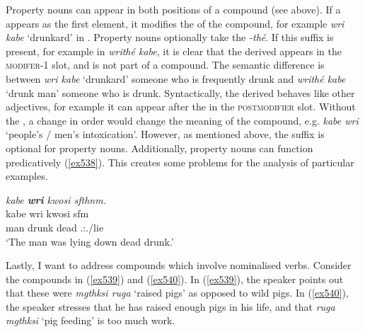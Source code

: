 Property nouns can appear in both positions of a compound (see  above). If a  appears as the first element, it modifies the  of the compound, for example \emph{wri kabe} `drunkard' in . Property nouns optionally take the  \emph{-thé}. If this suffix is present, for example in \emph{writhé kabe}, it is clear that the derived  appears in the \textsc{modifer-1} slot, and is not part of a compound. The semantic difference is between \emph{wri kabe} `drunkard' \textendash{} someone who is frequently drunk \textendash{} and \emph{writhé kabe} `drunk man' \textendash{} someone who is drunk. Syntactically, the derived  behaves like other adjectives, for example it can appear after the  in the \textsc{postmodifier} slot. Without the , a change in order would change the meaning of the compound, e.g. \emph{kabe wri} `people's / men's intoxication'. However, as mentioned above, the  suffix is optional for property nouns. Additionally, property nouns can function predicatively (\ref{ex538}). This creates some problems for the analysis of particular examples.

\begin{exe}
	\ex \emph{kabe \textbf{wri} kwosi sfthnm.}\\
	\gll kabe wri kwosi sfm\\
	man drunk dead \Tsg{}.\Masc{}:\Pst{}.\Dur{}/lie\\
	\trans `The man was lying down dead drunk.'\\
	\label{ex538}
\end{exe}

Lastly, I want to address compounds which involve nominalised verbs. Consider the compounds in (\ref{ex539}) and (\ref{ex540}). In (\ref{ex539}), the speaker points out that these were \emph{mgthksi ruga} `raised pigs' as opposed to wild pigs. In (\ref{ex540}), the speaker stresses that he has raised enough pigs in his life, and that \emph{ruga mgthksi} `pig feeding' is too much work.

